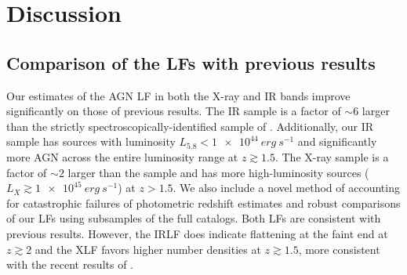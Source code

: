 \documentclass[twocolumn, trackchanges]{aastex63}
\begin{document}


\section{Discussion}
\label{sec:discussion}
\subsection{Comparison of the LFs with previous results}
Our estimates of the AGN LF in both the X-ray and IR bands improve significantly on those of previous results.
The IR sample is a factor of $\sim 6$ larger than the strictly spectroscopically-identified sample of \cite{lacy_spitzer_2015}.
Additionally, our IR sample has sources with luminosity $L_{5.8} < \SI{1e44}{erg~s^{-1}}$ and significantly more AGN across the entire luminosity range at $z\gtrsim 1.5$.
The X-ray sample is a factor of $\sim 2$ larger than the \cite{ranalli_210_2016} sample and has more high-luminosity sources ($L_X \gtrsim \SI{1e45}{erg~s^{-1}}$) at $z>1.5$.
We also include a novel method of accounting for catastrophic failures of photometric redshift estimates and robust comparisons of our LFs using subsamples of the full catalogs.
Both LFs are consistent with previous results.
However, the IRLF does indicate flattening at the faint end at $z\gtrsim2$ and the XLF favors higher number densities at $z\gtrsim1.5$, more consistent with the recent results of \cite{ranalli_210_2016}.
\end{document}
